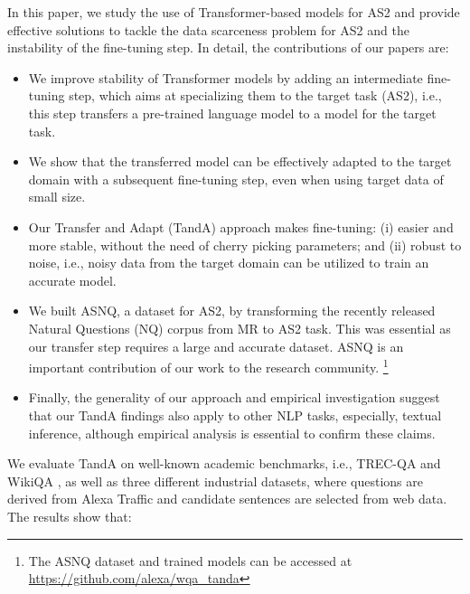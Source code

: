 \documentclass[letterpaper]{article} \usepackage{aaai20}  \usepackage{times}  \usepackage{helvet} \usepackage{courier}  \usepackage[hyphens]{url}  \usepackage{graphicx} \urlstyle{rm} \def\UrlFont{\rm}  \usepackage{graphicx}  \usepackage{todonotes}
\newcommand{\TANDA}{T{\sc and}A}
\begin{document}
In this paper, we study the use of Transformer-based models for AS2 and provide effective solutions to tackle the data scarceness problem for AS2 and the instability of the fine-tuning step. In detail, the contributions of our papers are:
\begin{itemize}
\item We improve stability of Transformer models by adding an intermediate fine-tuning step, which aims at specializing them to the target task (AS2), i.e., this step transfers a pre-trained language model to a model for the target task. 
\item We show that the transferred model can be effectively adapted to the target domain with a subsequent fine-tuning step, even when using target data of small size.
\item Our Transfer and Adapt ({\TANDA}) approach makes fine-tuning: (i) easier and more stable, without the need of cherry picking parameters; and (ii) robust to noise, i.e., noisy data from the target domain can be utilized to train an accurate model.
\item We built ASNQ, a dataset for AS2, by transforming the recently released Natural Questions (NQ) corpus \cite{47761} from MR to AS2 task. This was essential as our transfer step requires a large and accurate dataset. ASNQ is an important contribution of our work to the research community. \footnote{The ASNQ dataset and trained models can be accessed at \url{https://github.com/alexa/wqa_tanda}}
\item Finally, the generality of our approach and  empirical investigation suggest that our {\TANDA} findings also apply to other NLP tasks, especially, textual inference, although empirical analysis is essential to confirm these claims.
\end{itemize} 
We evaluate {\TANDA} on well-known academic benchmarks, i.e., TREC-QA \cite{wang-etal-2007-jeopardy} and WikiQA \cite{yang-etal-2015-wikiqa}, as well as three different industrial datasets, where questions are derived from Alexa Traffic and candidate sentences are selected from web data. The results show that:
\end{document}
